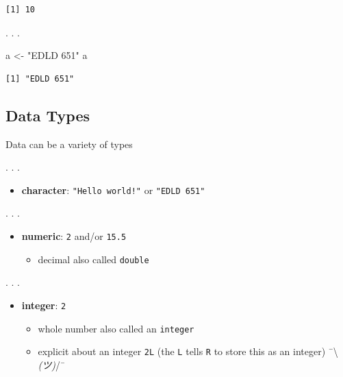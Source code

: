 \documentclass[
  letterpaper,
  DIV=11,
  numbers=noendperiod,
  oneside]{scrartcl}
\newenvironment{Shaded}{\begin{snugshade}}{\end{snugshade}}
\newcommand{\NormalTok}[1]{\textcolor[rgb]{0.00,0.23,0.31}{#1}}
\newcommand{\OtherTok}[1]{\textcolor[rgb]{0.00,0.23,0.31}{#1}}
\newcommand{\StringTok}[1]{\textcolor[rgb]{0.13,0.47,0.30}{#1}}
\providecommand{\tightlist}{%
  \setlength{\itemsep}{0pt}\setlength{\parskip}{0pt}}\usepackage{longtable,booktabs,array}
\begin{document}
\begin{verbatim}
[1] 10
\end{verbatim}

. . .

\begin{Shaded}
\begin{Highlighting}[]
\NormalTok{a }\OtherTok{\textless{}{-}} \StringTok{"EDLD 651"}
\NormalTok{a}
\end{Highlighting}
\end{Shaded}

\begin{verbatim}
[1] "EDLD 651"
\end{verbatim}

\hypertarget{data-types}{%
\subsection{Data Types}\label{data-types}}

Data can be a variety of types

. . .

\begin{itemize}
\tightlist
\item
  \textbf{character}: \texttt{"Hello\ world!"} or \texttt{"EDLD\ 651"}
\end{itemize}

. . .

\begin{itemize}
\tightlist
\item
  \textbf{numeric}: \texttt{2} and/or \texttt{15.5}

  \begin{itemize}
  \tightlist
  \item
    decimal also called \texttt{double}
  \end{itemize}
\end{itemize}

. . .

\begin{itemize}
\tightlist
\item
  \textbf{integer}: \texttt{2}

  \begin{itemize}
  \tightlist
  \item
    whole number also called an \texttt{integer}
  \item
    explicit about an integer \texttt{2L} (the \texttt{L} tells
    \texttt{R} to store this as an integer)
    ¯\textbackslash{}\emph{(ツ)}/¯
  \end{itemize}
\end{itemize}
\end{document}
